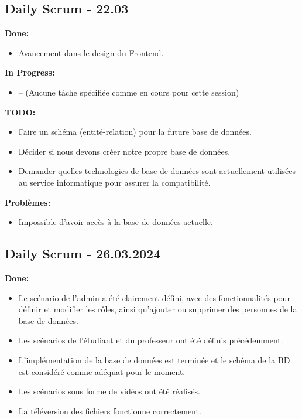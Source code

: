 \documentclass[11pt]{article}
\begin{document}
\subsection*{{\color{navy}Daily Scrum - 22.03}}

\textbf{Done:}
\begin{itemize}
  \item Avancement dans le design du Frontend.
\end{itemize}

\textbf{In Progress:}
\begin{itemize}
  \item -- (Aucune tâche spécifiée comme en cours pour cette session)
\end{itemize}

\textbf{TODO:}
\begin{itemize}
  \item Faire un schéma (entité-relation) pour la future base de données.
  \item Décider si nous devons créer notre propre base de données.
  \item Demander quelles technologies de base de données sont actuellement utilisées au service informatique pour assurer la compatibilité.
\end{itemize}

\textbf{Problèmes:}
\begin{itemize}
  \item Impossible d'avoir accès à la base de données actuelle.
\end{itemize}






\subsection*{{\color{navy}Daily Scrum - 26.03.2024}}

\textbf{Done:}
\begin{itemize}
  \item Le scénario de l’admin a été clairement défini, avec des fonctionnalités pour définir et modifier les rôles, ainsi qu'ajouter ou supprimer des personnes de la base de données.
  \item Les scénarios de l'étudiant et du professeur ont été définis précédemment.
  \item L'implémentation de la base de données est terminée et le schéma de la BD est considéré comme adéquat pour le moment.
  \item Les scénarios sous forme de vidéos ont été réalisés.
  \item La téléversion des fichiers fonctionne correctement.
\end{itemize}
\end{document}
